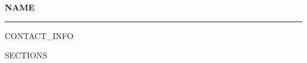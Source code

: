 \documentclass{article}
\newcommand{\name}[1]{
\textbf{{\Large #1}}
\vspace{5pt}
\hrule}
\begin{document}
\name{NAME}

CONTACT_INFO

SECTIONS
\end{document}
